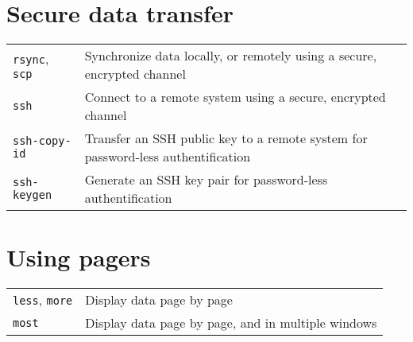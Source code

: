 \documentclass[10pt]{article}
\begin{document}
\begin{multicols}{2}
\section{Secure data transfer}
\begin{tabular}{ p{2.5cm} p{8.5cm} }
  \hline
  \texttt{rsync}, \texttt{scp} & Synchronize data locally, or remotely \newline using a secure, encrypted channel \\
  \rowcolor{Gray}
  \texttt{ssh} & Connect to a remote system using a \newline secure, encrypted channel\\
  \texttt{ssh-copy-id} & Transfer an SSH public key to a remote system for password-less authentification\\
  \rowcolor{Gray}
  \texttt{ssh-keygen} & Generate an SSH key pair for password-less authentification\\
  \hline
\end{tabular}

\columnbreak

\section{Using pagers}
\begin{tabular}{ p{2.5cm} p{8.5cm} }
  \hline
  \texttt{less}, \texttt{more} & Display data page by page \\
  \rowcolor{Gray}
  \texttt{most} & Display data page by page, and in multiple windows \\
  \hline
\end{tabular}


\end{multicols}
\end{document}
